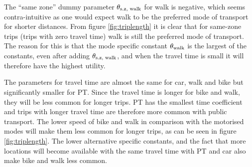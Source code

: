 


The ``same zone'' dummy parameter ${\theta_{\text{s.z, walk}}}$ for walk is negative, which seems contra-intuitive as one would expect walk to be the preferred mode of transport for shorter distances. From figure \ref{fig:triplength} it is clear that for same-zone trips (trips with zero travel time) walk is still the preferred mode of transport. The reason for this is that the mode specific constant ${\theta_{\text{walk}}}$ is the largest of the constants, even after adding ${\theta_{\text{s.z, walk}}}$, and when the travel time is small it will therefore have the highest utility.

The parameters for travel time are almost the same for car, walk and bike but significantly smaller for PT. Since the travel time is longer for bike and walk, they will be less common for longer trips. PT has the smallest time coefficient and trips with longer travel time are therefore more common with public transport. The lower speed of bike and walk in comparison with the motorised modes will make them less common for longer trips, as can be seen in figure \ref{fig:triplength}. The lower alternative specific constants, and the fact that more locations will become available with the same travel time with PT and car also make bike and walk less common.
